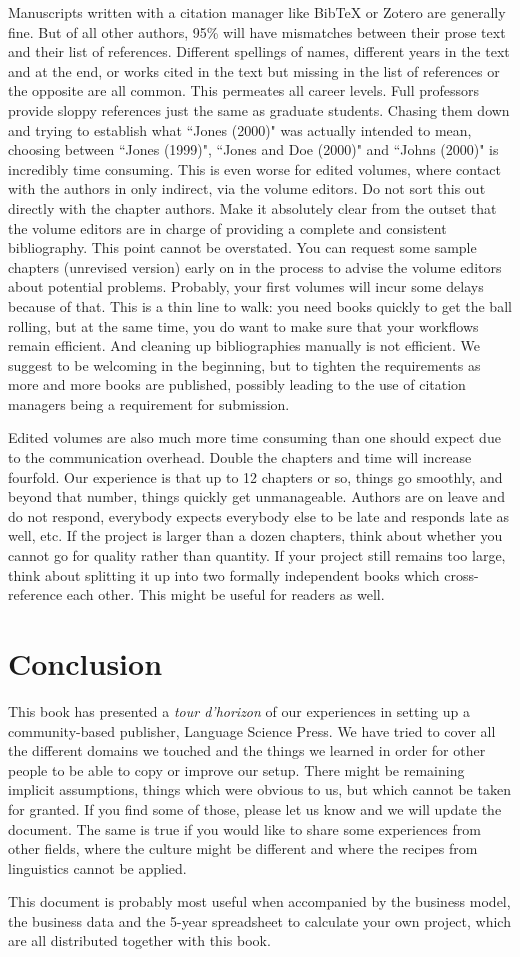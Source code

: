 \documentclass[nonflat,smallfont
]{langsci/langscibook}
\begin{document}
Manuscripts written with a citation manager like BibTeX or Zotero are generally fine. But of all other authors, 95\% will have mismatches between their prose text and their list of references. Different spellings of names, different years in the text and at the end, or works cited in the text but missing in the list of references or the opposite are all common. This permeates all career levels. Full professors provide sloppy references just the same as graduate students. Chasing them down and trying to establish what ``Jones (2000)" was actually intended to mean, choosing between ``Jones (1999)", ``Jones and Doe (2000)" and ``Johns (2000)" is incredibly time consuming. This is even worse for edited volumes, where contact with the authors in only indirect, via the volume editors. Do not sort this out directly with the chapter authors. Make it absolutely clear from the outset that the volume editors are in charge of providing a complete and consistent bibliography. This point cannot be overstated. You can request some sample chapters (unrevised version) early on in the process to advise the volume editors about potential problems. Probably, your first volumes will incur some delays because of that. This is a thin line to walk: you need books quickly to get the ball rolling, but at the same time, you do want to make sure that your workflows remain efficient. And cleaning up bibliographies manually is not efficient. We suggest to be welcoming in the beginning, but to tighten the requirements as more and more books are published, possibly leading to the use of citation managers being a requirement for submission. 

Edited volumes are also much more  time consuming than one should expect due to the communication overhead. Double the chapters and time will increase fourfold. Our experience is that up to 12 chapters or so, things go smoothly, and beyond that number, things quickly get unmanageable. Authors are on leave and do not respond, everybody expects everybody else to be late and responds late as well, etc. If the project is larger than a dozen chapters, think about whether you cannot go for quality rather than quantity. If your project still remains too large, think about splitting it up into two formally independent books which cross-reference each other. This might be useful for readers as well. 
 
\chapter{Conclusion} 
This book has presented a \textit{tour d'horizon} of our experiences in setting up a com\-mu\-nity-based publisher, Language Science Press. We have tried to cover all the different domains we touched and the things we learned in order for other people to be able to copy or improve our setup. 
There might be remaining implicit assumptions, things which were obvious to us, but which cannot be taken for granted. If you find some of those, please let us know and we will update the document. The same is true if  you would like to share some experiences from other fields, where the culture might be different and where the recipes from linguistics cannot be applied. 

This document is probably most useful when accompanied by the business model, the business data and the 5-year spreadsheet to calculate your own project, which are all distributed together with this book. 
\end{document}

